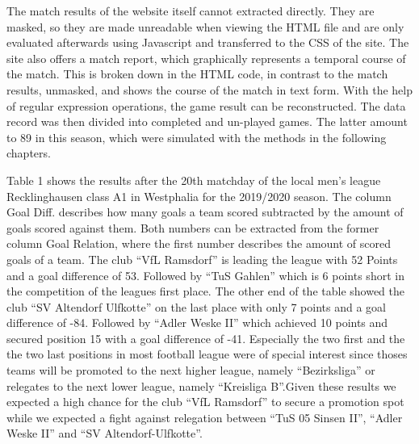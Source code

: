 \documentclass[12pt,a4paper]{article}
\begin{document}
The match results of the website itself cannot extracted directly. They
are masked, so they are made unreadable when viewing the HTML file and
are only evaluated afterwards using Javascript and transferred to the
CSS of the site. The site also offers a match report, which graphically
represents a temporal course of the match. This is broken down in the
HTML code, in contrast to the match results, unmasked, and shows the
course of the match in text form. With the help of regular expression
operations, the game result can be reconstructed. The data record was
then divided into completed and un-played games. The latter amount to 89
in this season, which were simulated with the methods in the following
chapters.

Table 1 shows the results after the 20th matchday of the local men's
league Recklinghausen class A1 in Westphalia for the 2019/2020 season.
The column Goal Diff. describes how many goals a team scored subtracted
by the amount of goals scored against them. Both numbers can be
extracted from the former column Goal Relation, where the first number
describes the amount of scored goals of a team. The club \enquote{VfL
Ramsdorf} is leading the league with 52 Points and a goal difference of
53. Followed by \enquote{TuS Gahlen} which is 6 points short in the
competition of the leagues first place. The other end of the table
showed the club \enquote{SV Altendorf Ulfkotte} on the last place with
only 7 points and a goal difference of -84. Followed by \enquote{Adler
Weske II} which achieved 10 points and secured position 15 with a goal
difference of -41. Especially the two first and the the two last
positions in most football league were of special interest since thoses
teams will be promoted to the next higher league, namely
\enquote{Bezirksliga} or relegates to the next lower league, namely
\enquote{Kreisliga B}.Given these results we expected a high chance for
the club \enquote{VfL Ramsdorf} to secure a promotion spot while we
expected a fight against relegation between \enquote{TuS 05 Sinsen II},
\enquote{Adler Weske II} and \enquote{SV Altendorf-Ulfkotte}.
\end{document}
